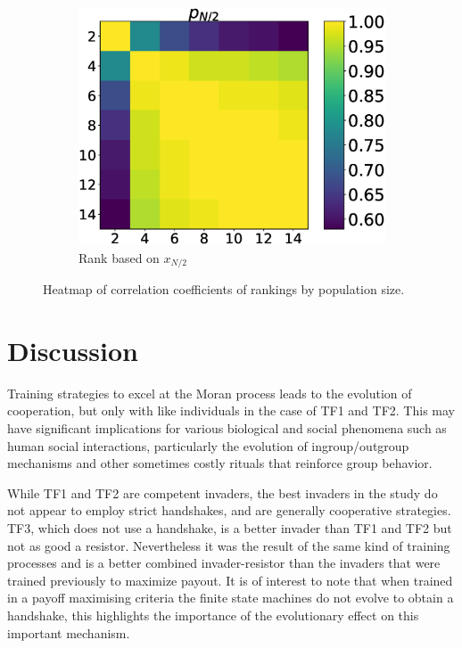 \documentclass[10pt,letterpaper]{article}
\begin{document}
\begin{figure}[!htbp]
\begin{subfigure}[t]{.3\columnwidth}
        \centering
        \includegraphics[draft, width=\columnwidth]{./Fig8.eps}
        \caption{Rank based on \(x_{N/2}\)}
    \end{subfigure}
    \caption{Heatmap of correlation coefficients of rankings by population size.}
    \label{fig:correlation_coefficients}
\end{figure}


\section*{Discussion}

Training strategies to excel
at the Moran process leads to the evolution of cooperation, but only with like
individuals in the case of TF1 and TF2. This may have significant implications
for various biological and social phenomena such as
human social interactions, particularly the evolution of ingroup/outgroup mechanisms
and other sometimes costly rituals that reinforce group behavior.

While TF1 and TF2 are competent invaders, the best invaders
in the study do not appear to employ strict handshakes, and are generally
cooperative strategies. TF3, which does not use a handshake, is a better invader
than TF1 and TF2 but not as good a resistor. Nevertheless it was the result
of the same kind of training processes and is a better combined invader-resistor
than the invaders that were trained previously to maximize payout. It is of
interest to note that when trained in a payoff maximising criteria the finite
state machines do not evolve to obtain a handshake, this highlights the
importance of the evolutionary effect on this important mechanism.
\end{document}
